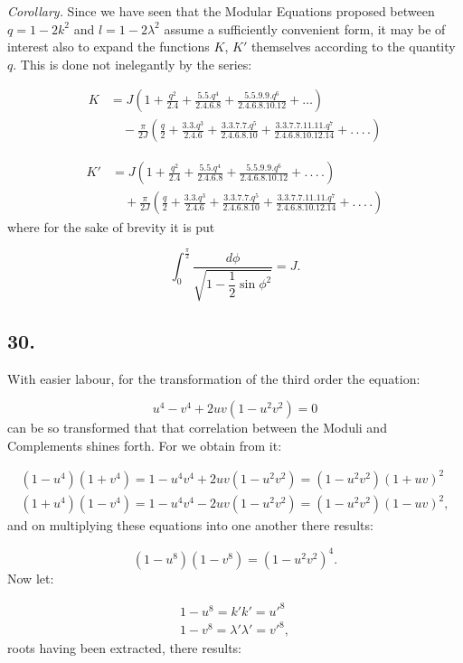 \documentclass{article}
\begin{document}
\emph{Corollary.} Since we have seen that the Modular Equations proposed between $q=1-2k^{2}$ and $l=1-2\lambda^{2}$ assume a sufficiently convenient form, it may be of interest also to expand the functions $K$, $K'$ themselves according to the quantity $q$. This is done not inelegantly by the series:

\[
\begin{aligned}
K&=J\left(1+\frac{q^{2}}{2.4}+\frac{5.5.q^{4}}{2.4.6.8}+\frac{5.5.9.9.q^{6}}{2.4.6.8.10.12}+\ldots\right)\\
&\quad-\frac{\pi}{2J}\left(\frac{q}{2}+\frac{3.3.q^{3}}{2.4.6}+\frac{3.3.7.7.q^{5}}{2.4.6.8.10}+\frac{3.3.7.7.11.11.q^{7}}{2.4.6.8.10.12.14}+.\,.\,.\,.\right)
\end{aligned}
\]

\[
\begin{aligned}
K'&=J\left(1+\frac{q^{2}}{2.4}+\frac{5.5.q^{4}}{2.4.6.8}+\frac{5.5.9.9.q^{6}}{2.4.6.8.10.12}+.\,.\,.\,.\right)\\
&\quad+\frac{\pi}{2J}\left(\frac{q}{2}+\frac{3.3.q^{3}}{2.4.6}+\frac{3.3.7.7.q^{5}}{2.4.6.8.10}+\frac{3.3.7.7.11.11.q^{7}}{2.4.6.8.10.12.14}+.\,.\,.\,.\right)
\end{aligned}
\]
where for the sake of brevity it is put

\[
\int_{0}^{\frac{\pi}{2}}\frac{d\phi}{\sqrt{1-\dfrac{1}{2}\sin\phi^{2}}}=J.
\]

\subsection*{30.}

With easier labour, for the transformation of the third order the equation:

\[
u^{4}-v^{4}+2uv(1-u^{2}v^{2})=0
\]
can be so transformed that that correlation between the Moduli and Complements shines forth. For we obtain from it:

\[
\begin{gathered}
(1-u^{4})(1+v^{4})=1-u^{4}v^{4}+2uv(1-u^{2}v^{2})=(1-u^{2}v^{2})(1+uv)^{2}\\
(1+u^{4})(1-v^{4})=1-u^{4}v^{4}-2uv(1-u^{2}v^{2})=(1-u^{2}v^{2})(1-uv)^{2},
\end{gathered}
\]
and on multiplying these equations into one another there results:

\[
(1-u^{8})(1-v^{8})=(1-u^{2}v^{2})^{4}.
\]
Now let:

\[
\begin{gathered}
1-u^{8}=k'k'=u'^{8}\\
1-v^{8}=\lambda'\lambda'=v'^{8},
\end{gathered}
\]
roots having been extracted, there results:
\end{document}
